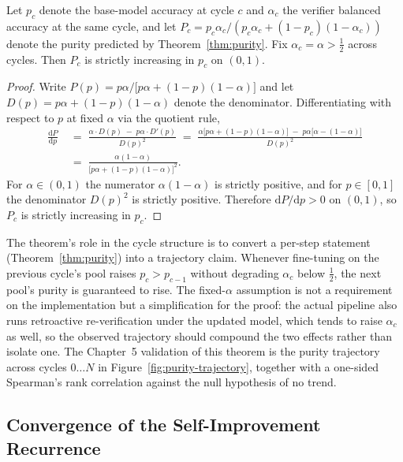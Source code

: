 \begin{theorem}
\label{thm:monotonicity}
Let $p_c$ denote the base-model accuracy at cycle $c$ and $\alpha_c$ the verifier balanced accuracy at the same cycle, and let $P_c = p_c \alpha_c / (p_c \alpha_c + (1 - p_c)(1 - \alpha_c))$ denote the purity predicted by Theorem~\ref{thm:purity}. Fix $\alpha_c = \alpha > \tfrac{1}{2}$ across cycles. Then $P_c$ is strictly increasing in $p_c$ on $(0, 1)$.
\end{theorem}

\begin{proof}
Write $P(p) = p\alpha \bigl/ \bigl[p\alpha + (1-p)(1-\alpha)\bigr]$ and let $D(p) = p\alpha + (1-p)(1-\alpha)$ denote the denominator. Differentiating with respect to $p$ at fixed $\alpha$ via the quotient rule,
\begin{align*}
    \frac{\mathrm{d}P}{\mathrm{d}p}
    &\;=\; \frac{\alpha \cdot D(p) \;-\; p\alpha \cdot D'(p)}{D(p)^2}
    \;=\; \frac{\alpha\bigl[p\alpha + (1-p)(1-\alpha)\bigr] \;-\; p\alpha\bigl[\alpha - (1-\alpha)\bigr]}{D(p)^2} \\[2pt]
    &\;=\; \frac{\alpha(1-\alpha)}{\bigl[p\alpha + (1-p)(1-\alpha)\bigr]^2}.
\end{align*}
For $\alpha \in (0, 1)$ the numerator $\alpha(1-\alpha)$ is strictly positive, and for $p \in [0, 1]$ the denominator $D(p)^2$ is strictly positive. Therefore $\mathrm{d}P / \mathrm{d}p > 0$ on $(0, 1)$, so $P_c$ is strictly increasing in $p_c$.
\end{proof}

The theorem's role in the cycle structure is to convert a per-step statement (Theorem~\ref{thm:purity}) into a trajectory claim. Whenever fine-tuning on the previous cycle's pool raises $p_c > p_{c-1}$ without degrading $\alpha_c$ below $\tfrac{1}{2}$, the next pool's purity is guaranteed to rise. The fixed-$\alpha$ assumption is not a requirement on the implementation but a simplification for the proof: the actual pipeline also runs retroactive re-verification under the updated model, which tends to raise $\alpha_c$ as well, so the observed trajectory should compound the two effects rather than isolate one. The Chapter~5 validation of this theorem is the purity trajectory across cycles $0\ldots N$ in Figure~\ref{fig:purity-trajectory}, together with a one-sided Spearman's rank correlation against the null hypothesis of no trend.

\subsection{Convergence of the Self-Improvement Recurrence}
\label{sec:convergence-theorem}

